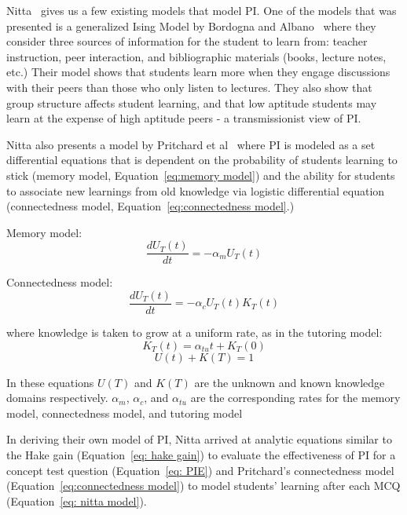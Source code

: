 \documentclass[twocolumn,secnumarabic,amssymb, nobibnotes, aps, prd]{revtex4-2}
\begin{document}
    Nitta~\cite{nitta2019mathematical} gives us a few existing models that model PI. 
    One of the models that was presented is a generalized Ising Model by Bordogna and Albano~\cite{bordogna2001theoretical,bordogna2003simulation} where they consider three sources of information for the student to learn from: teacher instruction, peer interaction, and bibliographic materials (books, lecture notes, etc.)
    Their model shows that students learn more when they engage discussions with their peers than those who only listen to lectures.
    They also show that group structure affects student learning, and that low aptitude students may learn at the expense of high aptitude peers - a transmissionist view of PI.

    Nitta also presents a model by Pritchard et al~\cite{pritchard2008mathematical} where PI is modeled as a set differential equations that is dependent on the probability of students learning to stick (memory model, Equation~\ref{eq:memory model}) and the ability for students to associate new learnings from old knowledge via logistic differential equation (connectedness model, Equation~\ref{eq:connectedness model}.)

    Memory model:
    \begin{equation}
        \label{eq:memory model}
        \frac{dU_T(t)}{dt} = -\alpha_m U_T(t)
    \end{equation}

    Connectedness model:
    \begin{equation}
        \label{eq:connectedness model}
        \frac{dU_T(t)}{dt} = -\alpha_c U_T(t)K_T(t)
    \end{equation}

    where knowledge is taken to grow at a uniform rate, as in the tutoring model:
    \begin{equation}
        \label{eq:tutoring model}
        K_T(t) = \alpha_{tu}t + K_T(0)
    \end{equation}
    \begin{equation}
        U(t) + K(T) = 1
    \end{equation}

    In these equations $U(T)$ and $K(T)$ are the unknown and known knowledge domains respectively. $\alpha_m$, $\alpha_c$, and $\alpha_{tu}$ are the corresponding rates for the memory model, connectedness model, and tutoring model 

    In deriving their own model of PI, Nitta arrived at analytic equations similar to the Hake gain (Equation~\ref{eq: hake gain}) to evaluate the effectiveness of PI for a concept test question (Equation~\ref{eq: PIE}) and Pritchard's connectedness model (Equation~\ref{eq:connectedness model}) to model students' learning after each MCQ (Equation~\ref{eq: nitta model}).
\end{document}
